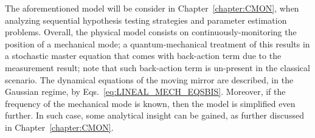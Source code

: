 The aforementioned model will be consider in Chapter~\ref{chapter:CMON}, when analyzing sequential hypothesis testing strategies and parameter estimation problems. Overall, the physical model consists on continuously-monitoring the position of a mechanical mode; a quantum-mechanical treatment of this results in a stochastic master equation that comes with back-action term due to the measurement result; note that such back-action term is un-present in the classical scenario. The dynamical equations of the moving mirror are described, in the Gaussian regime, by Eqs.~\ref{eq:LINEAL_MECH_EQSBIS}. Moreover, if the frequency of the mechanical mode is known, then the model is simplified even further. In such case, some analytical insight can be gained, as further discussed in Chapter~\ref{chapter:CMON}.
